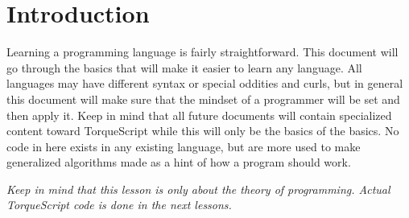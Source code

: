 \section{Introduction}

Learning a programming language is fairly straightforward. This document will go through the basics that will make it easier to learn any language. All languages may have different syntax or special oddities and curls, but in general this document will make sure that the mindset of a programmer will be set and then apply it. Keep in mind that all future documents will contain specialized content toward TorqueScript while this will only be the basics of the basics. No code in here exists in any existing language, but are more used to make generalized algorithms made as a hint of how a program should work.

\textit{Keep in mind that this lesson is only about the theory of programming. Actual TorqueScript code is done in the next lessons.}

